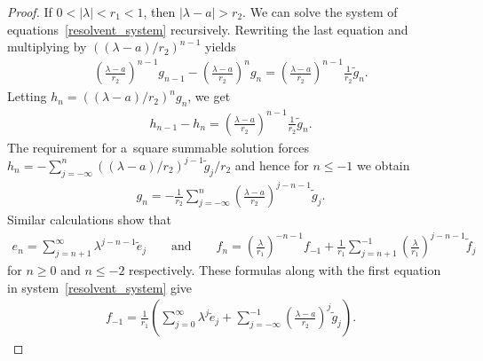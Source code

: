 \begin{proof}
If $0<|\lambda|<r_1<1$, then $|\lambda-a|>r_2$.
We can solve the system of equations~\eqref{resolvent_system} recursively.
Rewriting the last equation and multiplying by $((\lambda-a)/r_2)^{n-1}$ yields
\begin{gather*}
\left(\frac{\lambda-a}{r_2}\right)^{n-1}g_{n-1}-\left(\frac{\lambda-a}{r_2}\right)^ng_n
=\left(\frac{\lambda-a}{r_2}\right)^{n-1}\frac{1}{r_2}\tilde{g}_n.
\end{gather*}
Letting $h_n=((\lambda-a)/r_2)^ng_n$, we get
\begin{gather*}
h_{n-1}-h_n=\left(\frac{\lambda-a}{r_2}\right)^{n-1}\frac{1}{r_2}\tilde{g}_n.
\end{gather*}
The requirement for a~square summable solution forces $h_n =
-\sum\limits_{j=-\infty}^n((\lambda-a)/r_2)^{j-1}\tilde{g}_j/r_2$ and hence for $n\le-1$ we obtain
\begin{gather*}
g_n=-\frac{1}{r_2}\sum\limits_{j=-\infty}^n\left(\frac{\lambda-a}{r_2}\right)^{j-n-1}\tilde{g}_j.
\end{gather*}
Similar calculations show that
\begin{gather*}
e_n=\sum\limits_{j=n+1}^\infty \lambda^{j-n-1}\tilde{e}_j
\qquad
\text{and}
\qquad
f_n=\left(\frac{\lambda}{r_1}\right)^{-n-1}f_{-1}+\frac{1}{r_1}\sum\limits_{j=n+1}^{-1}\left(\frac{\lambda}{r_1}\right)^{j-n-1}\tilde{f}_j
\end{gather*}
for $n\ge0$ and $n\le-2$ respectively.
These formulas along with the f\/irst equation in system~\eqref{resolvent_system} give
\begin{gather*}
f_{-1}=\frac{1}{r_1}\left(\sum\limits_{j=0}^\infty\lambda^j\tilde{e}_j+\sum\limits_{j=-\infty}^{-1}\left(\frac{\lambda
- a}{r_2}\right)^j\tilde{g}_j\right).
\end{gather*}


\end{proof}
